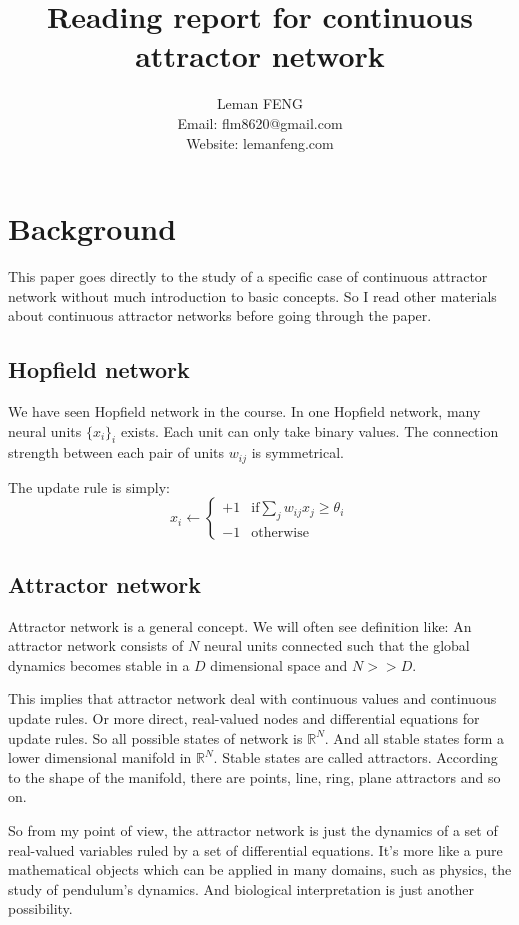 \documentclass{article}
\title{Reading report for continuous attractor network}
\author{Leman FENG\\ Email: flm8620@gmail.com\\Website: lemanfeng.com}
\begin{document}
	\maketitle
	\section{Background}
	This paper \cite{romani2010continuous} goes directly to the study of a specific case of continuous attractor network without much introduction to basic concepts. So I read other materials about continuous attractor networks before going through the paper.
	
	\subsection{Hopfield network}
	We have seen Hopfield network in the course. In one Hopfield network, many neural units $\{x_i\}_i$ exists. Each unit can only take binary values. The connection strength between each pair of units $w_{ij}$ is symmetrical.
	
	The update rule is simply:
	\begin{equation}
	x_i \leftarrow
	\begin{cases}
	+1 & \text{if} \sum_{j}w_{ij}x_j \geq \theta_i\\
	-1 & \text{otherwise}
	\end{cases}
	\end{equation}
	
	\subsection{Attractor network}
	Attractor network is a general concept. We will often see definition like: An attractor network consists of $N$ neural units connected such that the global dynamics becomes stable in a $D$ dimensional space and $N>>D$.
	
	This implies that attractor network deal with continuous values and continuous update rules. Or more direct, real-valued nodes and differential equations for update rules. So all possible states of network is $\mathbb{R}^N$. And all stable states form a lower dimensional manifold in $\mathbb{R}^N$. Stable states are called attractors. According to the shape of the manifold, there are points, line, ring, plane attractors and so on.
	
	So from my point of view, the attractor network is just the dynamics of a set of real-valued variables ruled by a set of differential equations. It's more like a pure mathematical objects which can be applied in many domains, such as physics, the study of pendulum's dynamics. And biological interpretation is just another possibility.
	
\end{document}
